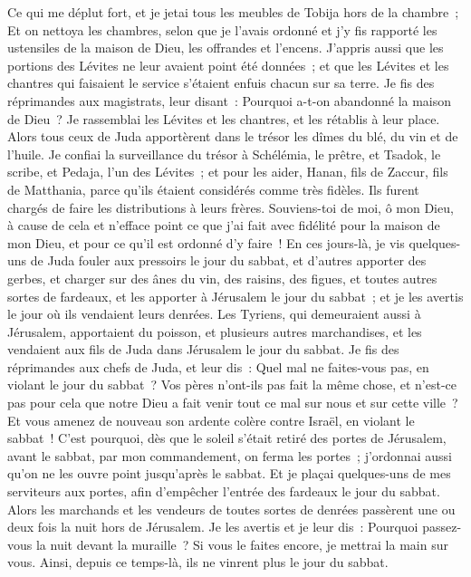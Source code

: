\begin{multicols}{2}
Ce qui me déplut fort, et je jetai tous les meubles de Tobija hors de la chambre~;
Et on nettoya les chambres, selon que je l'avais ordonné et j'y fis rapporté les ustensiles de la maison de Dieu, les offrandes et l'encens.
J'appris aussi que les portions des Lévites ne leur avaient point été données~; et que les Lévites et les chantres qui faisaient le service s'étaient enfuis chacun sur sa terre.
Je fis des réprimandes aux magistrats, leur disant~: Pourquoi a-t-on abandonné la maison de Dieu~? Je rassemblai les Lévites et les chantres, et les rétablis à leur place.
Alors tous ceux de Juda apportèrent dans le trésor les dîmes du blé, du vin et de l'huile.
Je confiai la surveillance du trésor à Schélémia, le prêtre, et Tsadok, le scribe, et Pedaja, l'un des Lévites~; et pour les aider, Hanan, fils de Zaccur, fils de Matthania, parce qu'ils étaient considérés comme très fidèles. Ils furent chargés de faire les distributions à leurs frères.
Souviens-toi de moi, ô mon Dieu, à cause de cela et n'efface point ce que j'ai fait avec fidélité pour la maison de mon Dieu, et pour ce qu'il est ordonné d'y faire~!
En ces jours-là, je vis quelques-uns de Juda fouler aux pressoirs le jour du sabbat, et d'autres apporter des gerbes, et charger sur des ânes du vin, des raisins, des figues, et toutes autres sortes de fardeaux, et les apporter à Jérusalem le jour du sabbat~; et je les avertis le jour où ils vendaient leurs denrées.
Les Tyriens, qui demeuraient aussi à Jérusalem, apportaient du poisson, et plusieurs autres marchandises, et les vendaient aux fils de Juda dans Jérusalem le jour du sabbat.
Je fis des réprimandes aux chefs de Juda, et leur dis~: Quel mal ne faites-vous pas, en violant le jour du sabbat~?
Vos pères n'ont-ils pas fait la même chose, et n'est-ce pas pour cela que notre Dieu a fait venir tout ce mal sur nous et sur cette ville~? Et vous amenez de nouveau son ardente colère contre Israël, en violant le sabbat~!
C'est pourquoi, dès que le soleil s'était retiré des portes de Jérusalem, avant le sabbat, par mon commandement, on ferma les portes~; j'ordonnai aussi qu'on ne les ouvre point jusqu'après le sabbat. Et je plaçai quelques-uns de mes serviteurs aux portes, afin d'empêcher l'entrée des fardeaux le jour du sabbat.
Alors les marchands et les vendeurs de toutes sortes de denrées passèrent une ou deux fois la nuit hors de Jérusalem.
Je les avertis et je leur dis~: Pourquoi passez-vous la nuit devant la muraille~? Si vous le faites encore, je mettrai la main sur vous. Ainsi, depuis ce temps-là, ils ne vinrent plus le jour du sabbat.

\end{multicols}
